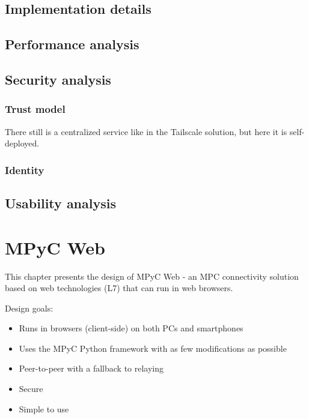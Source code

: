 \section{Implementation details}\label{thesis__090-mpyc-web.md__implementation-details}

\section{Performance analysis}\label{thesis__090-mpyc-web.md__performance-analysis}

\section{Security analysis}\label{thesis__090-mpyc-web.md__security-analysis}

\subsection{Trust model}\label{thesis__090-mpyc-web.md__trust-model}

There still is a centralized service like in the Tailscale solution, but here it is self-deployed.

\subsection{Identity}\label{thesis__090-mpyc-web.md__identity}

\section{Usability analysis}\label{thesis__090-mpyc-web.md__usability-analysis}

\chapter{MPyC Web}\label{thesis__090-mpyc-web.md__mpyc-web-1}

This chapter presents the design of MPyC Web - an MPC connectivity solution based on web technologies (L7) that can run in web browsers.

Design goals:

\begin{itemize}
\tightlist
\item
  Runs in browsers (client-side) on both PCs and smartphones
\item
  Uses the MPyC Python framework with as few modifications as possible
\item
  Peer-to-peer with a fallback to relaying
\item
  Secure
\item
  Simple to use
\end{itemize}

